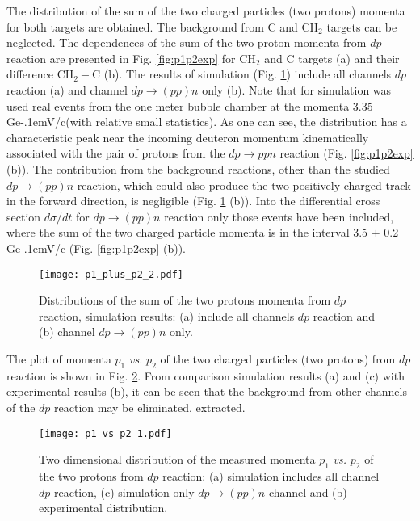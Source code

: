 \documentclass[twocolumn,epjc3]{svjour3}
\newcommand{\dpfrag} {\ensuremath{dp \rightarrow ppn}\xspace}
\newcommand{\dpchex} {\ensuremath{dp \rightarrow (pp)n}\xspace}
\newcommand{\GeVc}   {Ge\kern-.1emV/c\xspace}
\begin{document}
The distribution of the sum of the two charged particles (two protons) momenta
for both targets are obtained. The background from C and CH$_2$ targets can be
neglected. The dependences of the sum of the two proton momenta from $dp$
reaction are presented in Fig. \ref{fig:p1p2exp} for CH$_2$ and C targets (a)
and their difference CH$_2-$C (b). The results of simulation
(Fig. \ref{fig:p1p2sim}) include all channels $dp$ reaction (a) and channel
\dpchex only (b). Note that for simulation was used real events from the one
meter bubble chamber at the momenta 3.35 \GeVc (with relative small statistics).
As one can see, the distribution has a characteristic peak near the incoming
deuteron momentum kinematically associated with the pair of protons from the
\dpfrag reaction (Fig. \ref{fig:p1p2exp} (b)). The contribution from the
background reactions, other than the studied \dpchex reaction, which could also
produce the two positively charged track in the forward direction, is negligible
(Fig. \ref{fig:p1p2sim} (b)). Into the differential cross section $d\sigma/dt$
for \dpchex reaction only those events have been included, where the sum of the
two charged particle momenta is in the interval 3.5 $\pm$ 0.2 \GeVc
(Fig. \ref{fig:p1p2exp} (b)).

\begin{figure}%
  \centering
  \texttt{[image: p1\_plus\_p2\_2.pdf]}
  \caption{Distributions of the sum of the two protons momenta from $dp$
    reaction, simulation results: (a) include all channels $dp$ reaction and (b)
    channel \dpchex only.}
  \label{fig:p1p2sim}
\end{figure}

The plot of momenta $p_1$ \textit{vs.} $p_2$ of the two charged particles (two
protons) from $dp$ reaction is shown in Fig. \ref{fig:p1vsp2}. From comparison
simulation results (a) and (c) with experimental results (b), it can be seen
that the background from other channels of the $dp$ reaction may be eliminated,
extracted.

\begin{figure}[t]
  \centering
  \texttt{[image: p1\_vs\_p2\_1.pdf]} %
  \caption{Two dimensional distribution of the measured momenta $p_1$
    \textit{vs.} $p_2$ of the two protons from $dp$ reaction: (a) simulation
    includes all channel $dp$ reaction, (c) simulation only \dpchex channel and
    (b) experimental distribution.}
  \label{fig:p1vsp2}
\end{figure}
\end{document}
